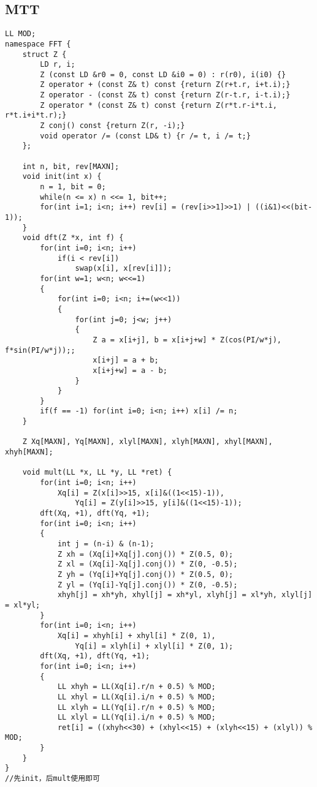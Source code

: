 \documentclass[twocolumn,a4]{article}
\begin{document}
\subsection{MTT}
\begin{lstlisting}
LL MOD;
namespace FFT {
    struct Z {
		LD r, i;
		Z (const LD &r0 = 0, const LD &i0 = 0) : r(r0), i(i0) {}
		Z operator + (const Z& t) const {return Z(r+t.r, i+t.i);}
		Z operator - (const Z& t) const {return Z(r-t.r, i-t.i);}
		Z operator * (const Z& t) const {return Z(r*t.r-i*t.i, r*t.i+i*t.r);}
		Z conj() const {return Z(r, -i);}
		void operator /= (const LD& t) {r /= t, i /= t;}
	};

	int n, bit, rev[MAXN];
	void init(int x) {
		n = 1, bit = 0;
		while(n <= x) n <<= 1, bit++;
		for(int i=1; i<n; i++) rev[i] = (rev[i>>1]>>1) | ((i&1)<<(bit-1));
	}
	void dft(Z *x, int f) {
		for(int i=0; i<n; i++)
			if(i < rev[i])
				swap(x[i], x[rev[i]]);
		for(int w=1; w<n; w<<=1)
		{
			for(int i=0; i<n; i+=(w<<1))
			{
				for(int j=0; j<w; j++)
				{
					Z a = x[i+j], b = x[i+j+w] * Z(cos(PI/w*j), f*sin(PI/w*j));;
					x[i+j] = a + b;
					x[i+j+w] = a - b;
				}
			}
		}
		if(f == -1) for(int i=0; i<n; i++) x[i] /= n;
	}

	Z Xq[MAXN], Yq[MAXN], xlyl[MAXN], xlyh[MAXN], xhyl[MAXN], xhyh[MAXN];

	void mult(LL *x, LL *y, LL *ret) {
		for(int i=0; i<n; i++)
			Xq[i] = Z(x[i]>>15, x[i]&((1<<15)-1)),
				Yq[i] = Z(y[i]>>15, y[i]&((1<<15)-1));
		dft(Xq, +1), dft(Yq, +1);
		for(int i=0; i<n; i++)
		{
			int j = (n-i) & (n-1);
			Z xh = (Xq[i]+Xq[j].conj()) * Z(0.5, 0);
			Z xl = (Xq[i]-Xq[j].conj()) * Z(0, -0.5);
			Z yh = (Yq[i]+Yq[j].conj()) * Z(0.5, 0);
			Z yl = (Yq[i]-Yq[j].conj()) * Z(0, -0.5);
			xhyh[j] = xh*yh, xhyl[j] = xh*yl, xlyh[j] = xl*yh, xlyl[j] = xl*yl;
		}
		for(int i=0; i<n; i++)
			Xq[i] = xhyh[i] + xhyl[i] * Z(0, 1),
				Yq[i] = xlyh[i] + xlyl[i] * Z(0, 1);
		dft(Xq, +1), dft(Yq, +1);
		for(int i=0; i<n; i++)
		{
			LL xhyh = LL(Xq[i].r/n + 0.5) % MOD;
			LL xhyl = LL(Xq[i].i/n + 0.5) % MOD;
			LL xlyh = LL(Yq[i].r/n + 0.5) % MOD;
			LL xlyl = LL(Yq[i].i/n + 0.5) % MOD;
			ret[i] = ((xhyh<<30) + (xhyl<<15) + (xlyh<<15) + (xlyl)) % MOD;
		}
	}
}
//先init，后mult使用即可
\end{lstlisting}
\end{document}
